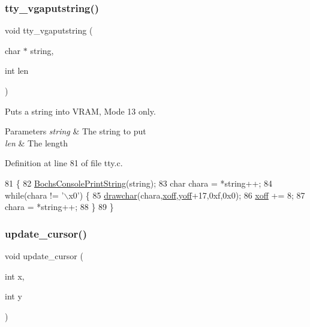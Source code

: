 \subsubsection{\texorpdfstring{tty\+\_\+vgaputstring()}{tty\_vgaputstring()}}
{\footnotesize\ttfamily void tty\+\_\+vgaputstring (\begin{DoxyParamCaption}\item[{char $\ast$}]{string,  }\item[{int}]{len }\end{DoxyParamCaption})}



Puts a string into V\+R\+AM, Mode 13 only. 


\begin{DoxyParams}{Parameters}
{\em string} & The string to put \\
\hline
{\em len} & The length \\
\hline
\end{DoxyParams}


Definition at line 81 of file tty.\+c.


\begin{DoxyCode}
81                                              \{
82     \hyperlink{a00056_a19e1f554d03c977f8b947f21489daa41_a19e1f554d03c977f8b947f21489daa41}{BochsConsolePrintString}(\textcolor{keywordtype}{string});
83     \textcolor{keywordtype}{char} chara = *\textcolor{keywordtype}{string}++;
84     \textcolor{keywordflow}{while}(chara != \textcolor{stringliteral}{'\(\backslash\)x0'}) \{
85         \hyperlink{a00041_a2c8df7a20b47341b70d97a7ff21d86ea_a2c8df7a20b47341b70d97a7ff21d86ea}{drawchar}(chara,\hyperlink{a00140_abaa0d20f0e52ce0d3a7d706f6ac16266_abaa0d20f0e52ce0d3a7d706f6ac16266}{xoff},\hyperlink{a00140_a1a7539764d0ae8cd06ce45c62cf92bca_a1a7539764d0ae8cd06ce45c62cf92bca}{yoff}+17,0xf,0x0);
86         \hyperlink{a00140_abaa0d20f0e52ce0d3a7d706f6ac16266_abaa0d20f0e52ce0d3a7d706f6ac16266}{xoff} += 8;
87         chara = *\textcolor{keywordtype}{string}++;
88     \}
89 \}
\end{DoxyCode}
\mbox{\label{a00140_a492f5021d7340613e732ef37bbaa04e4_a492f5021d7340613e732ef37bbaa04e4}} 
\subsubsection{\texorpdfstring{update\+\_\+cursor()}{update\_cursor()}}
{\footnotesize\ttfamily void update\+\_\+cursor (\begin{DoxyParamCaption}\item[{int}]{x,  }\item[{int}]{y }\end{DoxyParamCaption})}



